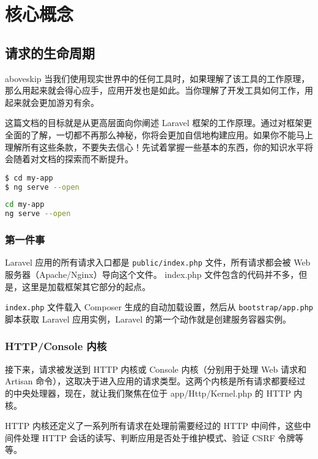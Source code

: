 \documentclass{progartcn}
\begin{document}
\section{核心概念}

\subsection{请求的生命周期}
aboveskip
当我们使用现实世界中的任何工具时，如果理解了该工具的工作原理，那么用起来就会得心应手，应用开发也是如此。当你理解了开发工具如何工作，用起来就会更加游刃有余。

这篇文档的目标就是从更高层面向你阐述 Laravel 框架的工作原理。通过对框架更全面的了解，一切都不再那么神秘，你将会更加自信地构建应用。如果你不能马上理解所有这些条款，不要失去信心！先试着掌握一些基本的东西，你的知识水平将会随着对文档的探索而不断提升。

\begin{lstlisting}[language=bash,style=bashstyle]
$ cd my-app
$ ng serve --open
\end{lstlisting}

\begin{lstlisting}[language=bash,style=bashoutstyle]
cd my-app
ng serve --open
\end{lstlisting}

\subsubsection{第一件事}

Laravel 应用的所有请求入口都是 \verb|public/index.php| 文件，所有请求都会被 Web 服务器（Apache/Nginx）导向这个文件。 index.php 文件包含的代码并不多，但是，这里是加载框架其它部分的起点。

\verb|index.php| 文件载入 Composer 生成的自动加载设置，然后从 \verb|bootstrap/app.php| 脚本获取 Laravel 应用实例，Laravel 的第一个动作就是创建服务容器实例。

\subsubsection{HTTP/Console 内核}

接下来，请求被发送到 HTTP 内核或 Console 内核（分别用于处理 Web 请求和 Artisan 命令），这取决于进入应用的请求类型。这两个内核是所有请求都要经过的中央处理器，现在，就让我们聚焦在位于 app/Http/Kernel.php 的 HTTP 内核。

HTTP 内核还定义了一系列所有请求在处理前需要经过的 HTTP 中间件，这些中间件处理 HTTP 会话的读写、判断应用是否处于维护模式、验证 CSRF 令牌等等。
\end{document}
